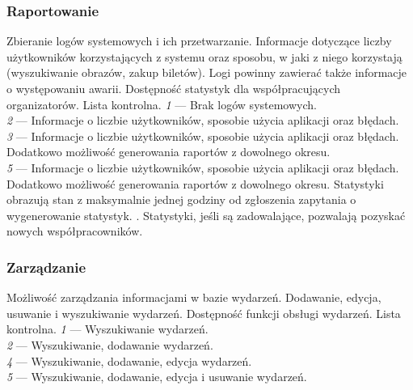 \documentclass[10pt]{dokument-ppi}
\begin{document}
\subsubsection{Raportowanie}
\begin{requirement}
    \desc%
        Zbieranie logów systemowych i ich przetwarzanie. Informacje dotyczące
        liczby użytkowników korzystających z systemu oraz sposobu, w jaki z
        niego korzystają (wyszukiwanie obrazów, zakup biletów). Logi powinny
        zawierać także informacje o występowaniu awarii.
    \metric%
        Dostępność statystyk dla współpracujących organizatorów.
    \tool%
        Lista kontrolna.
    \scale%
        \emph{1} --- Brak logów systemowych.\\
        \emph{2} --- Informacje o liczbie użytkowników, sposobie użycia aplikacji oraz błędach.\\
        \emph{3} --- Informacje o liczbie użytkowników, sposobie użycia aplikacji oraz błędach. Dodatkowo możliwość generowania raportów z dowolnego okresu.\\
        \emph{5} --- Informacje o liczbie użytkowników, sposobie użycia aplikacji oraz błędach. Dodatkowo możliwość generowania raportów z dowolnego okresu. Statystyki obrazują stan z maksymalnie jednej godziny od zgłoszenia zapytania o wygenerowanie statystyk.
    . Statystyki, jeśli są zadowalające, pozwalają pozyskać nowych
        współpracowników.
\end{requirement}

\subsubsection{Zarządzanie}
\begin{requirement}
    \desc%
        Możliwość zarządzania informacjami w bazie wydarzeń. Dodawanie, edycja, usuwanie i wyszukiwanie wydarzeń.
    \metric%
        Dostępność funkcji obsługi wydarzeń.
    \tool%
        Lista kontrolna.
    \scale%
        \emph{1} --- Wyszukiwanie wydarzeń.\\
        \emph{2} --- Wyszukiwanie, dodawanie wydarzeń.\\
        \emph{4} --- Wyszukiwanie, dodawanie, edycja wydarzeń.\\
        \emph{5} --- Wyszukiwanie, dodawanie, edycja i usuwanie wydarzeń.
\end{requirement}
\end{document}
